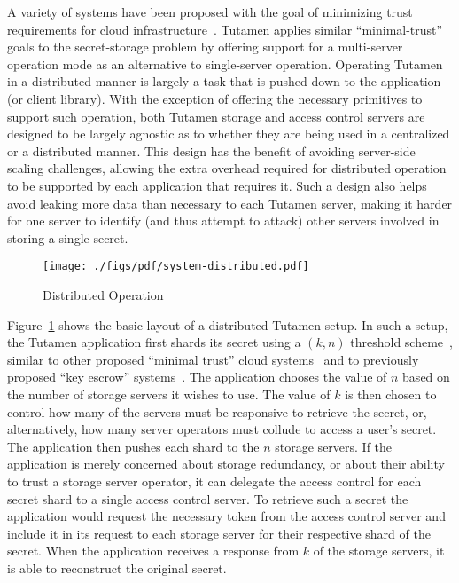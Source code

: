 A variety of systems have been proposed with the goal of minimizing
trust requirements for cloud infrastructure~\cite{bessani2011,
  kallahalla2003, kubiatowicz2000, mahajan2011,
  wilcox-o'hearn2008}. Tutamen applies similar ``minimal-trust'' goals
to the secret-storage problem by offering support for a multi-server
operation mode as an alternative to single-server operation. Operating
Tutamen in a distributed manner is largely a task that is pushed down
to the application (or client library). With the exception of offering
the necessary primitives to support such operation, both Tutamen
storage and access control servers are designed to be largely agnostic
as to whether they are being used in a centralized or a distributed
manner. This design has the benefit of avoiding server-side scaling
challenges, allowing the extra overhead required for distributed
operation to be supported by each application that requires it. Such a
design also helps avoid leaking more data than necessary to each
Tutamen server, making it harder for one server to identify (and thus
attempt to attack) other servers involved in storing a single secret.

\begin{figure}[th]
  \centering
  \texttt{[image: ./figs/pdf/system-distributed.pdf]}
  \caption{Distributed Operation}
  \label{fig:tutamen:systemdistributed}
\end{figure}

Figure~\ref{fig:tutamen:systemdistributed} shows the basic layout of a
distributed Tutamen setup. In such a setup, the Tutamen application
first shards its secret using a $(k, n)$ threshold
scheme~\cite{krawczyk1993, shamir1979}, similar to other proposed
``minimal trust'' cloud systems~\cite{bessani2011} and to previously
proposed ``key escrow'' systems~\cite{blaze1996, denning1996}. The
application chooses the value of $n$ based on the number of storage
servers it wishes to use. The value of $k$ is then chosen to control
how many of the servers must be responsive to retrieve the secret, or,
alternatively, how many server operators must collude to access a
user's secret. The application then pushes each shard to the $n$
storage servers. If the application is merely concerned about storage
redundancy, or about their ability to trust a storage server operator,
it can delegate the access control for each secret shard to a single
access control server. To retrieve such a secret the application would
request the necessary token from the access control server and include
it in its request to each storage server for their respective shard of
the secret. When the application receives a response from $k$ of the
storage servers, it is able to reconstruct the original secret.

